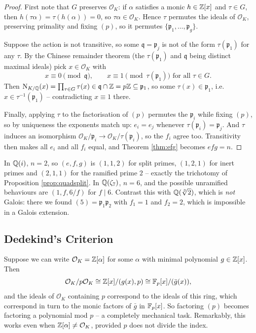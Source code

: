 \documentclass[a4paper]{scrartcl}
\renewcommand{\OO}{\mathcal{O}}
\newcommand{\Nm}{\operatorname{N}}
\newcommand{\fp}{\mathfrak{p}}
\newcommand{\fq}{\mathfrak{q}}
\begin{document}
\begin{proof}
	First note that $G$ preserves $\OO_K$: if $\alpha$ satisfies a monic $h \in \mathbb{Z}[x]$ and $\tau \in G$, then $h(\tau\alpha) = \tau(h(\alpha)) = 0$, so $\tau\alpha \in \OO_K$. Hence $\tau$ permutes the ideals of $\OO_K$, preserving primality and fixing $(p)$, so it permutes $\{\fp_1,\dots,\fp_g\}$.

	Suppose the action is not transitive, so some $\fq = \fp_j$ is not of the form $\tau(\fp_1)$ for any $\tau$. By the Chinese remainder theorem (the $\tau(\fp_1)$ and $\fq$ being distinct maximal ideals) pick $x \in \OO_K$ with
	$$x \equiv 0 \pmod{\fq}, \qquad x \equiv 1 \pmod{\tau(\fp_1)} \text{ for all } \tau \in G.$$
	Then $\Nm_{K/\Q}(x) = \prod_{\tau\in G}\tau(x) \in \fq \cap \Z = p\Z \subseteq \fp_1$, so some $\tau(x) \in \fp_1$, i.e.\ $x \in \tau^{-1}(\fp_1)$ -- contradicting $x \equiv 1$ there.

	Finally, applying $\tau$ to the factorisation of $(p)$ permutes the $\fp_i$ while fixing $(p)$, so by uniqueness the exponents match up: $e_i = e_j$ whenever $\tau(\fp_i) = \fp_j$. And $\tau$ induces an isomorphism $\OO_K/\fp_i \to \OO_K/\tau(\fp_i)$, so the $f_i$ agree too. Transitivity then makes all $e_i$ and all $f_i$ equal, and Theorem \ref{thm:efg} becomes $efg = n$.
\end{proof}

\begin{example}
	In $\mathbb{Q}(i)$, $n = 2$, so $(e,f,g)$ is $(1,1,2)$ for split primes, $(1,2,1)$ for inert primes and $(2,1,1)$ for the ramified prime $2$ -- exactly the trichotomy of Proposition \ref{prop:quadsplit}. In $\mathbb{Q}(\zeta_7)$, $n=6$, and the possible unramified behaviours are $(1,f,6/f)$ for $f \mid 6$. Contrast this with $\mathbb{Q}(\sqrt[3]2)$, which is \emph{not} Galois: there we found $(5) = \fp_1\fp_2$ with $f_1 = 1$ and $f_2 = 2$, which is impossible in a Galois extension.
\end{example}

\subsection{Dedekind's Criterion}

Suppose we can write $\OO_K = \Z[\alpha]$ for some $\alpha$ with minimal polynomial $g \in \mathbb{Z}[x]$. Then
$$\OO_K/p\OO_K \cong \Z[x]/(g(x), p) \cong \F_p[x]/(\bar g(x)),$$
and the ideals of $\OO_K$ containing $p$ correspond to the ideals of this ring, which correspond in turn to the monic factors of $\bar g$ in $\mathbb{F}_p[x]$. So factoring $(p)$ becomes factoring a polynomial mod $p$ -- a completely mechanical task. Remarkably, this works even when $\Z[\alpha] \neq \OO_K$, provided $p$ does not divide the index.
\end{document}
